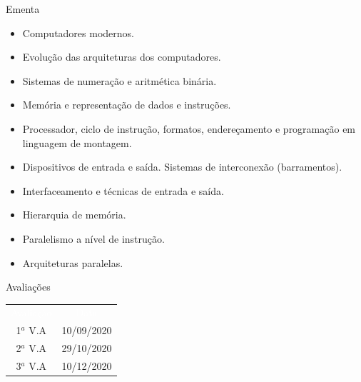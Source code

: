\documentclass[aspectratio=169,
				xcolor=table]{beamer}
\begin{document}
	\begin{frame}[allowframebreaks]{Ementa}
		\begin{itemize}
			\item Computadores modernos. 
			\vspace{0.75em}
			\item Evolução das arquiteturas dos computadores.
			\vspace{0.75em}
			\item  Sistemas de numeração e aritmética binária. 
			\vspace{0.75em}
			\item Memória e representação de dados e instruções.
			\vspace{0.75em}
			\item  Processador, ciclo de instrução, formatos, endereçamento e programação em linguagem de montagem.
			\vspace{0.75em}
			\item  Dispositivos de entrada e saída. Sistemas de interconexão (barramentos).
			\vspace{0.75em}
			\item  Interfaceamento e técnicas de entrada e saída.
			\vspace{0.75em}
			\item  Hierarquia de memória. 
			\vspace{0.75em}
			\item Paralelismo a nível de instrução. 
			\vspace{0.75em}
			\item Arquiteturas paralelas.
		\end{itemize}
	\end{frame}
	
	\begin{frame}{Avaliações}
		\begin{eftable}
			\LARGE
			\begin{tabular}{c | c}
				\textcolor{white}{Avaliação} & 
				\textcolor{white}{Data} \\
				1${}^a$ V.A & 10/09/2020 \\
				2${}^a$ V.A & 29/10/2020 \\
				3${}^a$ V.A & 10/12/2020 \\			
			\end{tabular}
		\end{eftable}
	\end{frame}	
	
\end{document}
